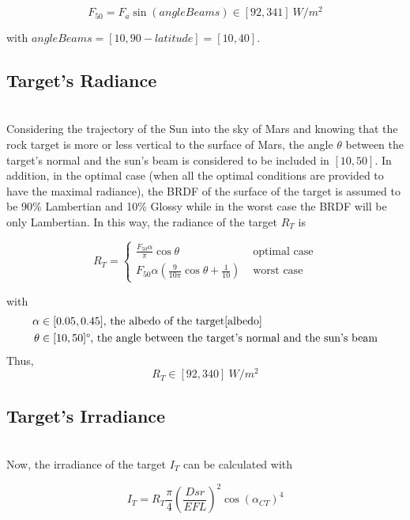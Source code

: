 \begin{equation}
F_{50} = F_a\sin(angleBeams) \in [92, 341] \ W/m^2
\end{equation}

with $angleBeams = [10, 90-latitude] = [10, 40]$\textdegree.

\subsection{Target's Radiance}
~\\
Considering the trajectory of the Sun into the sky of Mars and knowing that the rock target is more or less vertical to the surface of Mars, the angle $\theta$ between the target's normal and the sun's beam is considered to be included in $[10, 50]$\textdegree. In addition, in the optimal case (when all the optimal conditions are provided to have the maximal radiance), the BRDF of the surface of the target is assumed to be 90\% Lambertian and 10\% Glossy while in the worst case the BRDF will be only Lambertian. In this way, the radiance of the target $R_T$ is

\begin{equation}
\label{eq:Radiance Target}
R_T = \left\{
	\begin{array}{ll}
		\frac{F_{50}\alpha}{\pi}\cos \theta & \mbox{ optimal case} \\
		F_{50}\alpha(\frac{9}{10\pi}\cos\theta + \frac{1}{10}) & \mbox{ worst case}
	\end{array}
\right.
\end{equation}

with 
\begin{align*}
	\alpha & \in [0.05, 0.45]\mbox{, the albedo of the target\ref{albedo}} \\
	\theta & \in [10, 50]\mbox{\textdegree, the angle between the target's normal and the sun's beam}
\end{align*}
Thus, 
\begin{equation}
\label{eq:Radiance Target Range}
R_T \in [92, 340] \ W/m^2
\end{equation}

\subsection{Target's Irradiance}
~\\
Now, the irradiance of the target $I_T$ can be calculated with

\begin{equation}
\label{eq:Irradiance Target}
I_T = R_T\frac{\pi}{4}\left(\frac{Dsr}{EFL}\right)^2\cos (\alpha_{CT})^4
\end{equation}

